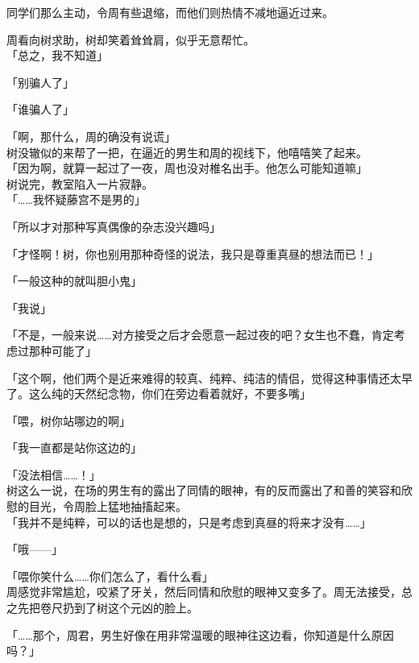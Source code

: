 同学们那么主动，令周有些退缩，而他们则热情不减地逼近过来。

周看向树求助，树却笑着耸耸肩，似乎无意帮忙。\\

「总之，我不知道」

「别骗人了」

「谁骗人了」

「啊，那什么，周的确没有说谎」\\

树没辙似的来帮了一把，在逼近的男生和周的视线下，他嘻嘻笑了起来。\\

「因为啊，就算一起过了一夜，周也没对椎名出手。他怎么可能知道嘛」\\

树说完，教室陷入一片寂静。\\

「……我怀疑藤宫不是男的」

「所以才对那种写真偶像的杂志没兴趣吗」

「才怪啊！树，你也别用那种奇怪的说法，我只是尊重真昼的想法而已！」

「一般这种的就叫胆小鬼」

「我说」

「不是，一般来说……对方接受之后才会愿意一起过夜的吧？女生也不蠢，肯定考虑过那种可能了」

「这个啊，他们两个是近来难得的较真、纯粹、纯洁的情侣，觉得这种事情还太早了。这么纯的天然纪念物，你们在旁边看着就好，不要多嘴」

「喂，树你站哪边的啊」

「我一直都是站你这边的」

「没法相信……！」\\

树这么一说，在场的男生有的露出了同情的眼神，有的反而露出了和善的笑容和欣慰的目光，令周脸上猛地抽搐起来。\\

「我并不是纯粹，可以的话也是想的，只是考虑到真昼的将来才没有……」

「哦——」

「喂你笑什么……你们怎么了，看什么看」\\

周感觉非常尴尬，咬紧了牙关，然后同情和欣慰的眼神又变多了。周无法接受，总之先把卷尺扔到了树这个元凶的脸上。\\

\vspace{2\baselineskip}

「……那个，周君，男生好像在用非常温暖的眼神往这边看，你知道是什么原因吗？」

